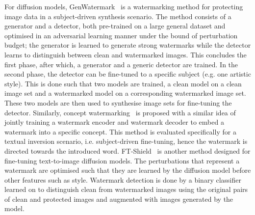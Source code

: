 \documentclass[conference]{IEEEtran}
\begin{document}
For diffusion models, GenWatermark~\cite{ma_generative_2023} is a watermarking method for protecting image data in a subject-driven synthesis scenario. 
The method consists of a generator and a detector, both pre-trained on a large general dataset and optimised in an adversarial learning manner under the bound of perturbation budget; the generator is learned to generate strong watermarks while the detector learns to distinguish between clean and watermarked images. 
This concludes the first phase, after which, a generator and a generic detector are trained. 
In the second phase, the detector can be fine-tuned to a specific subject (e.g. one artistic style). 
This is done such that two models are trained, a clean model on a clean image set and a watermarked model on a corresponding watermarked image set. 
These two models are then used to synthesise image sets for fine-tuning the detector.
Similarly, concept watermarking~\cite{feng_catch_2023} is proposed with a similar idea of jointly training a watermark encoder and watermark decoder to embed a watermark into a specific concept. 
This method is evaluated specifically for a textual inversion scenario, i.e. subject-driven fine-tuning, hence the watermark is directed towards the introduced word.   
FT-Shield~\cite{cui_ft-shield_2023} is another method designed for fine-tuning text-to-image diffusion models. 
The perturbations that represent a watermark are optimised such that they are learned by the diffusion model before other features such as style.
Watermark detection is done by a binary classifier learned on to distinguish clean from watermarked images using the original pairs of clean and protected images and augmented with images generated by the model. 
\end{document}
